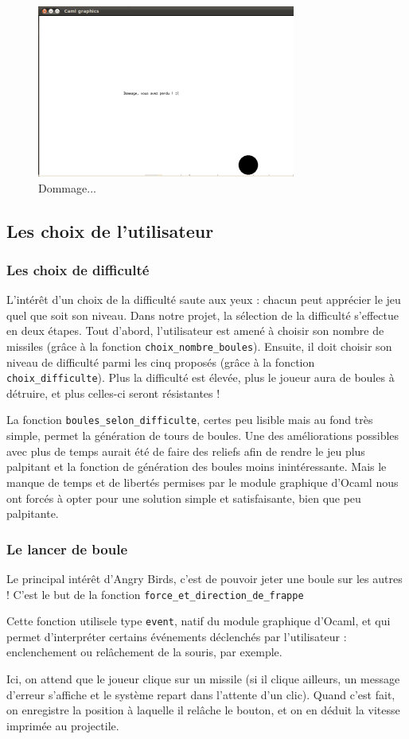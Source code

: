 \documentclass[10pt]{article}
\begin{document}
\begin{figure}
 \centering
\includegraphics{rapport3.png}
\caption{Dommage...}
\end{figure}

\subsection{Les choix de l'utilisateur}
\subsubsection{Les choix de difficulté}
L'intérêt d'un choix de la difficulté saute aux yeux : chacun peut apprécier le jeu quel que soit son niveau. Dans notre projet, la sélection
de la difficulté s'effectue en deux étapes. Tout d'abord, l'utilisateur est amené à choisir son nombre de missiles (grâce à la fonction \texttt{choix\_nombre\_boules}). Ensuite, il doit choisir
son niveau de difficulté parmi les cinq proposés (grâce à la fonction \texttt{choix\_difficulte}). Plus la difficulté est élevée, plus le joueur aura de boules à détruire, et plus celles-ci
seront résistantes !
\par La fonction \texttt{boules\_selon\_difficulte}, certes peu lisible mais au fond très simple, permet la génération de tours de
boules. Une des améliorations possibles avec plus de temps aurait été de faire des reliefs afin de rendre le jeu plus palpitant et la
fonction de génération des boules moins inintéressante. Mais le manque de temps et de libertés permises par le module graphique d'Ocaml
nous ont forcés à opter pour une solution simple et satisfaisante, bien que peu palpitante.
\subsubsection{Le lancer de boule}
Le principal intérêt d'Angry Birds, c'est de pouvoir jeter une boule sur les autres ! C'est le but de la fonction \texttt{force\_et\_direction\_de\_frappe}
\par Cette fonction utilisele type \texttt{event}, natif du module graphique d'Ocaml, et qui permet d'interpréter certains événements
déclenchés par l'utilisateur : enclenchement ou relâchement de la souris, par exemple.
\par Ici, on attend que le joueur clique sur un missile (si il clique ailleurs, un message d'erreur s'affiche et le système repart dans l'attente
d'un clic). Quand c'est fait, on enregistre la position à laquelle il relâche le bouton, et on en déduit la vitesse imprimée au projectile.
\end{document}
